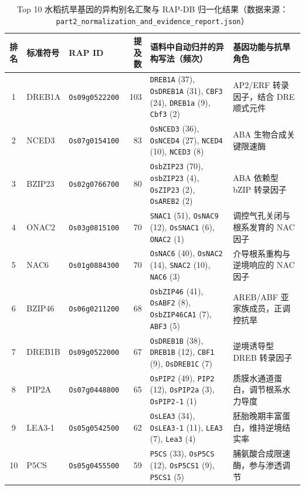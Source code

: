 \documentclass[conference]{IEEEtran}
\begin{document}
\begin{table}[t]
  \centering
  \footnotesize
  \renewcommand{\arraystretch}{1.05}
  \setlength{\tabcolsep}{4pt}
  \caption{Top 10 水稻抗旱基因的异构别名汇聚与 RAP-DB 归一化结果（数据来源：\texttt{part2\_normalization\_and\_evidence\_report.json}）}
  \label{tab:top_genes}
  \begin{tabularx}{\textwidth}{@{}c l l r p{6.2cm} X@{}}
    \toprule
    排名 & 标准符号 & RAP ID & 提及数 & 语料中自动归并的异构写法（频次） & 基因功能与抗旱角色 \\
    \midrule
    1  & DREB1A & \texttt{Os09g0522200} & 103 & \texttt{DREB1A} (37), \texttt{OsDREB1A} (31), \texttt{CBF3} (24), \texttt{DREB1a} (9), \texttt{Cbf3} (2) & AP2/ERF 转录因子，结合 DRE 顺式元件 \\
    2  & NCED3  & \texttt{Os07g0154100} & 83  & \texttt{OsNCED3} (36), \texttt{OsNCED4} (27), \texttt{NCED4} (10), \texttt{NCED3} (8) & ABA 生物合成关键限速酶 \\
    3  & BZIP23 & \texttt{Os02g0766700} & 80  & \texttt{OsbZIP23} (70), \texttt{osbZIP23} (4), \texttt{OsZIP23} (2), \texttt{OsAREB2} (2) & ABA 依赖型 bZIP 转录因子 \\
    4  & ONAC2  & \texttt{Os03g0815100} & 70  & \texttt{SNAC1} (51), \texttt{OsNAC9} (12), \texttt{OsSNAC1} (6), \texttt{ONAC2} (1) & 调控气孔关闭与根系发育的 NAC 因子 \\
    5  & NAC6   & \texttt{Os01g0884300} & 70  & \texttt{OsNAC6} (40), \texttt{OsNAC2} (14), \texttt{SNAC2} (10), \texttt{NAC6} (3) & 介导根系重构与逆境响应的 NAC 因子 \\
    6  & BZIP46 & \texttt{Os06g0211200} & 68  & \texttt{OsbZIP46} (41), \texttt{OsABF2} (8), \texttt{OsbZIP46CA1} (7), \texttt{ABF3} (5) & AREB/ABF 亚家族成员，正调控抗旱 \\
    7  & DREB1B & \texttt{Os09g0522000} & 67  & \texttt{OsDREB1B} (38), \texttt{DREB1B} (12), \texttt{CBF1} (9), \texttt{OsDREB1C} (7) & 逆境诱导型 DREB 转录因子 \\
    8  & PIP2A  & \texttt{Os07g0448800} & 65  & \texttt{OsPIP2} (49), \texttt{PIP2} (12), \texttt{OsPIP2a} (3), \texttt{OsPIP2-1} (1) & 质膜水通道蛋白，调节根系水力导度 \\
    9  & LEA3-1 & \texttt{Os05g0542500} & 62  & \texttt{OsLEA3} (34), \texttt{OsLEA3-1} (11), \texttt{LEA3} (7), \texttt{Lea3} (4) & 胚胎晚期丰富蛋白，维持逆境结实率 \\
    10 & P5CS   & \texttt{Os05g0455500} & 59  & \texttt{P5CS} (33), \texttt{OsP5CS} (12), \texttt{OsP5CS1} (9), \texttt{P5CS1} (5) & 脯氨酸合成限速酶，参与渗透调节 \\
    \bottomrule
  \end{tabularx}
\end{table}
\end{document}
